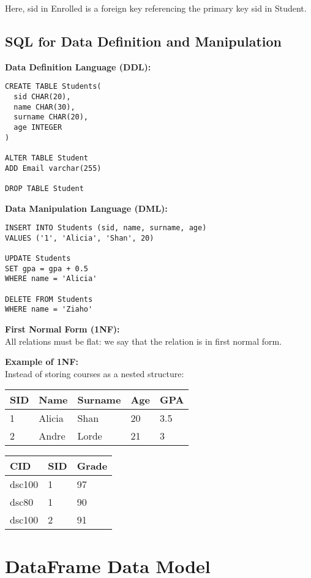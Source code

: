 \documentclass{article}
\begin{document}
Here, sid in Enrolled is a foreign key referencing the primary key sid in Student.

\subsection*{SQL for Data Definition and Manipulation}

\textbf{Data Definition Language (DDL):}
\begin{verbatim}
CREATE TABLE Students(
  sid CHAR(20),
  name CHAR(30),
  surname CHAR(20),
  age INTEGER
)

ALTER TABLE Student
ADD Email varchar(255)

DROP TABLE Student
\end{verbatim}

\textbf{Data Manipulation Language (DML):}
\begin{verbatim}
INSERT INTO Students (sid, name, surname, age)
VALUES ('1', 'Alicia', 'Shan', 20)

UPDATE Students
SET gpa = gpa + 0.5
WHERE name = 'Alicia'

DELETE FROM Students 
WHERE name = 'Ziaho'
\end{verbatim}

\textbf{First Normal Form (1NF):}\\
All relations must be flat: we say that the relation is in first normal form.

\textbf{Example of 1NF:}\\
Instead of storing courses as a nested structure:

\begin{tabular}{lllll}
\hline
SID & Name & Surname & Age & GPA \\
\hline
1 & Alicia & Shan & 20 & 3.5 \\
2 & Andre & Lorde & 21 & 3 \\
\hline
\end{tabular}

\begin{tabular}{lll}
\hline
CID & SID & Grade \\
\hline
dsc100 & 1 & 97 \\
dsc80 & 1 & 90 \\
dsc100 & 2 & 91 \\
\hline
\end{tabular}

\section*{DataFrame Data Model}
\end{document}
